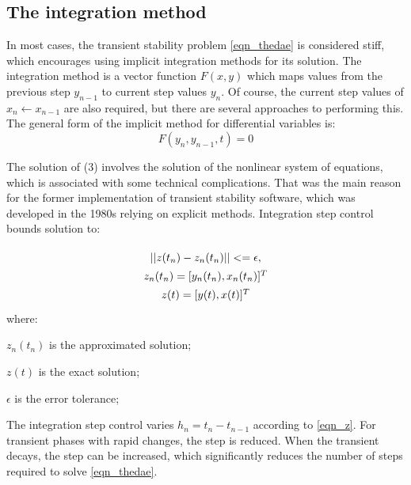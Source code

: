 \documentclass[lettersize,journal]{IEEEtran}
\begin{document}
\subsection{The integration method}

In most cases, the transient stability problem \eqref{eqn_thedae} is considered stiff, which encourages using implicit integration methods for its solution. The integration method is a vector function \(F(x,y)\) which maps values from the previous step \(y_{n-1}\) to current step values \(y_n\). Of course, the current step values of \(x_{n} \leftarrow x_{n-1}\) are also required, but there are several approaches to performing this. The general form of the implicit method for differential variables is:
\begin{equation}
	\label{eqn_implicit}
	F(y_n,y_{n-1},t)=0
\end{equation}

The solution of (3) involves the solution of the nonlinear system of equations, which is associated with some technical complications. That was the main reason for the former implementation of transient stability software, which was developed in the 1980s relying on explicit methods. Integration step control bounds solution to:

\begin{equation}
	\label{eqn_z}
	\def\arraystretch{1.4}
	\begin{array}{c}
		\vert\vert z(t_n)-z_n(t_n) \vert\vert <= \epsilon, \\
		z_n(t_n)=[y_n(t_n), x_n(t_n)]^T	 \\
		z(t)=[y(t), x(t)]^T \\
	\end{array}
\end{equation}
\noindent where:
\begin{description}
	\item  \(z_n(t_n)\) is the approximated solution;
	\item  \(z(t)\) is the exact solution;
	\item  \(\epsilon\) is the error tolerance;
\end{description}

The integration step control varies \(h_{n}=t_{n}-t_{n-1}\) according to \eqref{eqn_z}. For transient phases with rapid changes, the step is reduced. When the transient decays, the step can be increased, which significantly reduces the number of steps required to solve \eqref{eqn_thedae}.
\end{document}
